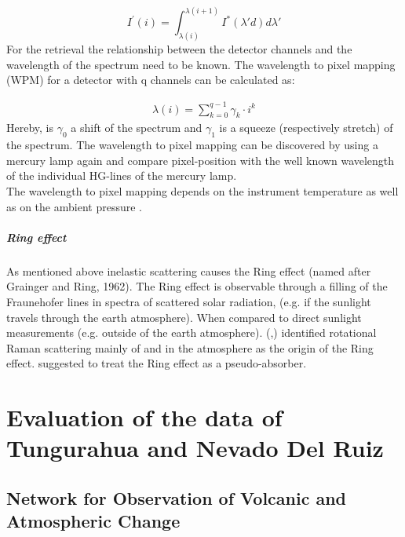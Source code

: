 \documentclass  [
  paper    = a4,
  BCOR     = 10mm,
  twoside,
  fontsize = 12pt,
  fleqn,
  toc      = bibnumbered,
  toc      = listofnumbered,
  numbers  = noendperiod,
  headings = normal,
  listof   = leveldown,
  version  = 3.03
]                                       {scrreprt}
\begin{document}
	\begin{equation}
	I^{'}\left(i\right) = \int_{\lambda(i)}^{\lambda(i+1)}I^{*}\left(\lambda{'}d\right)d\lambda{'}
	\end{equation}
	For the retrieval the relationship between the detector channels and the wavelength of the spectrum need to be known.
	The wavelength to pixel mapping (WPM) for a detector with q channels can be calculated as:

	\begin{eqnarray}
	\lambda(i) = \sum_{k=0}^{q-1}\gamma_{k}\cdot i^{k}
	\end{eqnarray}
	Hereby, is $\gamma_{0}$ a shift of the spectrum and $\gamma_{1}$ is a squeeze (respectively stretch) of the spectrum.
	The wavelength to pixel mapping can be discovered by using a mercury lamp again and compare pixel-position with the well known wavelength of the individual HG-lines of the mercury lamp.\\
	The wavelength to pixel mapping depends on the instrument temperature as well as on the ambient pressure \citep{lubcke2014bro}.
	\subsubsection*{Ring effect}
	As mentioned above inelastic scattering causes the Ring effect (named after Grainger and Ring, 1962).
	The Ring effect is observable through a filling of the Fraunehofer lines in spectra of scattered solar radiation, (e.g. if the sunlight travels through the earth atmosphere). When compared to direct sunlight measurements (e.g. outside of the earth atmosphere).
	(\cite{bussemer1993ring},\cite{solomon1987interpretation}) identified rotational Raman scattering mainly of
	 and  in the atmosphere as the origin of the Ring effect.
	\cite{solomon1987interpretation} suggested to treat the Ring effect as a pseudo-absorber. 


	
	\part{Evaluation of the data of Tungurahua and Nevado Del Ruiz}
	
	
	\chapter{Network for Observation of Volcanic and Atmospheric Change \label{NOVAC}}

	
	
\end{document}
